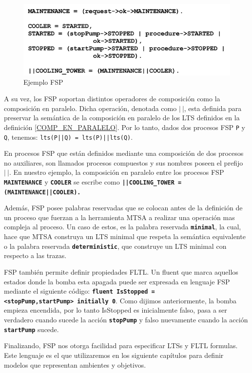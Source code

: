 \begin{figure}
    \centering
    \includegraphics[scale=0.50]{img/FSP.png}
    \caption{Ejemplo FSP}
    \label{FSP}
\end{figure}

A su vez, los FSP soportan distintos operadores de composición como la composición en paralelo. Dicha operación,
denotada como $|\ |$, esta definida para preservar la semántica de la composición en paralelo de los LTS definidos en la
definición \ref{COMP_EN_PARALELO}. Por lo tanto, dados dos procesos FSP \texttt{P} y \texttt{Q}, tenemos:
\texttt{lts(P||Q) = lts(P)||lts(Q)}.

En procesos FSP que están definidos mediante una composición de dos procesos no auxiliares, son llamados procesos
compuestos y sus nombres poseen el prefijo $|\ |$. En nuestro ejemplo, la composición en paralelo entre los procesos FSP 
\texttt{\textbf{MAINTENANCE}} y \texttt{\textbf{COOLER}} se escribe como \texttt{\textbf{||COOLING\_TOWER =
(MAINTENANCE||COOLER).}}

Además, FSP posee palabras reservadas que se colocan antes de la definición de un proceso que fuerzan a la herramienta
MTSA a realizar una operación mas compleja al proceso. Un caso de estos, es la palabra reservada
\texttt{\textbf{minimal}}, la cual, hace que MTSA construya un LTS minimal que respeta la semántica equivalente o la
palabra reservada \texttt{\textbf{deterministic}}, que construye un LTS minimal con respecto a las trazas.

FSP también permite definir propiedades FLTL. Un fluent que marca aquellos estados donde la bomba esta apagada puede ser
expresada en lenguaje FSP mediante el siguiente código: \texttt{\textbf{fluent IsStopped = <stopPump,startPump>\ initially 0}}.
Como dijimos anteriormente, la bomba empieza encendida, por lo tanto IsStopped es inicialmente falso, pasa a ser
verdadero cuando sucede la acción \texttt{\textbf{stopPump}} y falso nuevamente cuando la acción \texttt{\textbf{startPump}} sucede.

Finalizando, FSP nos otorga facilidad para especificar LTSs y FLTL formulas. Este lenguaje es el que utilizaremos en los
siguiente capítulos para definir modelos que representan ambientes y objetivos. 
